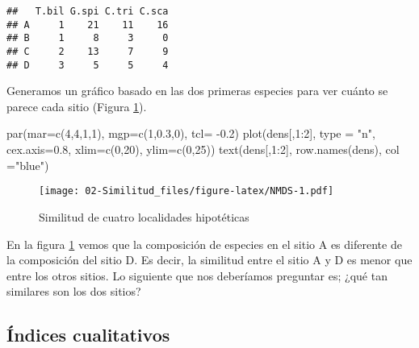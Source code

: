 \documentclass[
]{article}
\newenvironment{Shaded}{\begin{snugshade}}{\end{snugshade}}
\newcommand{\AttributeTok}[1]{\textcolor[rgb]{0.77,0.63,0.00}{#1}}
\newcommand{\DecValTok}[1]{\textcolor[rgb]{0.00,0.00,0.81}{#1}}
\newcommand{\FloatTok}[1]{\textcolor[rgb]{0.00,0.00,0.81}{#1}}
\newcommand{\FunctionTok}[1]{\textcolor[rgb]{0.00,0.00,0.00}{#1}}
\newcommand{\NormalTok}[1]{#1}
\newcommand{\SpecialCharTok}[1]{\textcolor[rgb]{0.00,0.00,0.00}{#1}}
\newcommand{\StringTok}[1]{\textcolor[rgb]{0.31,0.60,0.02}{#1}}
\begin{document}
\begin{verbatim}
##   T.bil G.spi C.tri C.sca
## A     1    21    11    16
## B     1     8     3     0
## C     2    13     7     9
## D     3     5     5     4
\end{verbatim}

Generamos un gráfico basado en las dos primeras especies para ver cuánto se parece cada sitio (Figura \ref{fig:NMDS}).

\begin{Shaded}
\begin{Highlighting}[]
\FunctionTok{par}\NormalTok{(}\AttributeTok{mar=}\FunctionTok{c}\NormalTok{(}\DecValTok{4}\NormalTok{,}\DecValTok{4}\NormalTok{,}\DecValTok{1}\NormalTok{,}\DecValTok{1}\NormalTok{), }\AttributeTok{mgp=}\FunctionTok{c}\NormalTok{(}\DecValTok{1}\NormalTok{,}\FloatTok{0.3}\NormalTok{,}\DecValTok{0}\NormalTok{), }\AttributeTok{tcl=} \SpecialCharTok{{-}}\FloatTok{0.2}\NormalTok{)}
\FunctionTok{plot}\NormalTok{(dens[,}\DecValTok{1}\SpecialCharTok{:}\DecValTok{2}\NormalTok{], }\AttributeTok{type =} \StringTok{"n"}\NormalTok{, }\AttributeTok{cex.axis=}\FloatTok{0.8}\NormalTok{, }\AttributeTok{xlim=}\FunctionTok{c}\NormalTok{(}\DecValTok{0}\NormalTok{,}\DecValTok{20}\NormalTok{), }\AttributeTok{ylim=}\FunctionTok{c}\NormalTok{(}\DecValTok{0}\NormalTok{,}\DecValTok{25}\NormalTok{)) }
\FunctionTok{text}\NormalTok{(dens[,}\DecValTok{1}\SpecialCharTok{:}\DecValTok{2}\NormalTok{], }\FunctionTok{row.names}\NormalTok{(dens), }\AttributeTok{col =}\StringTok{"blue"}\NormalTok{)}
\end{Highlighting}
\end{Shaded}

\begin{figure}
\centering
\texttt{[image: 02-Similitud\_files/figure-latex/NMDS-1.pdf]}
\caption{\label{fig:NMDS}Similitud de cuatro localidades hipotéticas}
\end{figure}

En la figura \ref{fig:NMDS} vemos que la composición de especies en el sitio A es diferente de la composición del sitio D. Es decir, la similitud entre el sitio A y D es menor que entre los otros sitios. Lo siguiente que nos deberíamos preguntar es; ¿qué tan similares son los dos sitios?

\hypertarget{uxedndices-cualitativos}{%
\subsection{Índices cualitativos}\label{uxedndices-cualitativos}}
\end{document}
